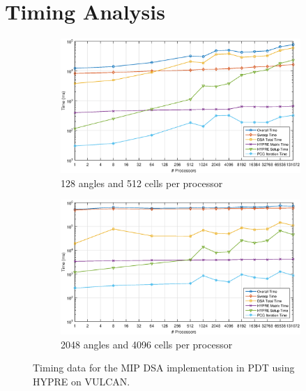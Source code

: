 \documentclass[preprint,review,12pt]{elsarticle}
\begin{document}
\section{Timing Analysis} \label{sec::timing}


\begin{figure}
\centering
{
	\begin{subfigure}[b]{\textwidth}
		\centering
		\includegraphics[width=\textwidth]{figures/A128.eps}
		\caption{128 angles and 512 cells per processor}
	\end{subfigure}
}
	\vspace{1cm}
{
	\begin{subfigure}[b]{\textwidth}
		\centering
		\includegraphics[width=\textwidth]{figures/A2048.eps}
		\caption{2048 angles and 4096 cells per processor}
	\end{subfigure}
}
\caption{Timing data for the MIP DSA implementation in PDT using HYPRE on VULCAN.}
\label{fig::DSA_Scaling_Timing}
\end{figure}
\end{document}
